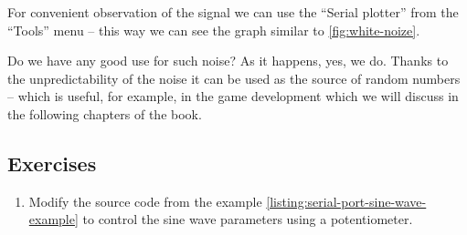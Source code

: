 \documentclass[../sparc.tex]{subfiles}
\begin{document}
For convenient observation of the signal we can use the ``Serial plotter'' from
the ``Tools'' menu -- this way we can see the graph similar to
\ref{fig:white-noize}.



Do we have any good use for such noise?  As it happens, yes, we do.  Thanks to
the unpredictability of the noise it can be used as the source of random numbers
-- which is useful, for example, in the game development which we will discuss in
the following chapters of the book.

\subsection{Exercises}

\begin{enumerate}
\item Modify the source code from the example \ref{listing:serial-port-sine-wave-example}
  to control the sine wave parameters using a potentiometer.
\end{enumerate}
\end{document}
